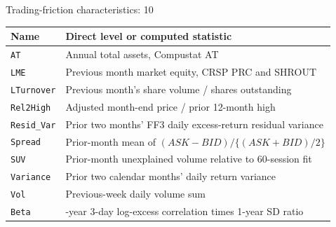 \documentclass[11pt]{beamer}
\begin{document}
\begin{frame}{Trading-friction characteristics: 10}
\scriptsize
\begin{tabular}{@{}l>{\raggedright\arraybackslash}p{}@{}}\toprule
Name & Direct level or computed statistic\\\midrule
\texttt{AT} & Annual total assets, Compustat AT\\
\texttt{LME} & Previous month market equity, CRSP PRC and SHROUT\\
\texttt{LTurnover} & Previous month's share volume / shares outstanding\\
\texttt{Rel2High} & Adjusted month-end price / prior 12-month high\\
\texttt{Resid\_Var} & Prior two months' FF3 daily excess-return residual variance\\
\texttt{Spread} & Prior-month mean of $(ASK-BID)/\{(ASK+BID)/2\}$\\
\texttt{SUV} & Prior-month unexplained volume relative to 60-session fit\\
\texttt{Variance} & Prior two calendar months' daily return variance\\
\texttt{Vol} & Previous-week daily volume sum\\
\texttt{Beta} & 5-year 3-day log-excess correlation times 1-year SD ratio\\\bottomrule
\end{tabular}\par
{}
\end{frame}
\end{document}
